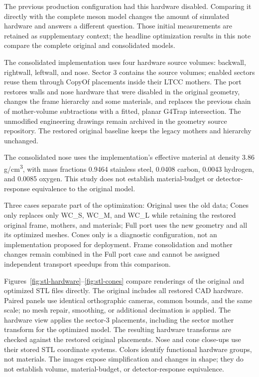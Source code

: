 The previous production configuration had this hardware disabled. Comparing it directly with the complete meson
model changes the amount of simulated hardware and answers a different question. Those initial measurements are
retained as supplementary context; the headline optimization results in this note compare the complete original
and consolidated models.

The consolidated implementation uses four hardware source volumes: backwall, rightwall, leftwall, and nose.
Sector 3 contains the source volumes; enabled sectors reuse them through CopyOf placements inside their LTCC
mothers. The port restores walls and nose hardware that were disabled in the original geometry, changes the
frame hierarchy and some materials, and replaces the previous chain of mother-volume subtractions with a
fitted, planar G4Trap intersection. The unmodified engineering drawings remain archived in the geometry source
repository. The restored original baseline keeps the legacy mothers and hierarchy unchanged.

The consolidated nose uses the implementation's effective material at density 3.86 g/cm\textsuperscript{3},
with mass fractions 0.9464 stainless steel, 0.0408 carbon, 0.0043 hydrogen, and 0.0085 oxygen. This study does
not establish material-budget or detector-response equivalence to the original model.

Three cases separate part of the optimization: Original uses the old data; Cones only replaces only WC\_S,
WC\_M, and WC\_L while retaining the restored original frame, mothers, and materials; Full port uses the new
geometry and all its optimized meshes. Cones only is a diagnostic configuration, not an implementation proposed
for deployment. Frame consolidation and mother changes remain combined in the Full port case and cannot be
assigned independent transport speedups from this comparison.

Figures~\ref{fig:stl-hardware}--\ref{fig:stl-cones} compare renderings of the original and optimized STL files
directly. The original includes all restored CAD hardware. Paired panels use identical orthographic cameras,
common bounds, and the same scale; no mesh repair, smoothing, or additional decimation is applied. The hardware
view applies the sector-3 placements, including the sector mother transform for the optimized model. The
resulting hardware transforms are checked against the restored original placements. Nose and cone close-ups use
their stored STL coordinate systems. Colors identify functional hardware groups, not materials. The images
expose simplification and changes in shape; they do not establish volume, material-budget, or detector-response
equivalence.

